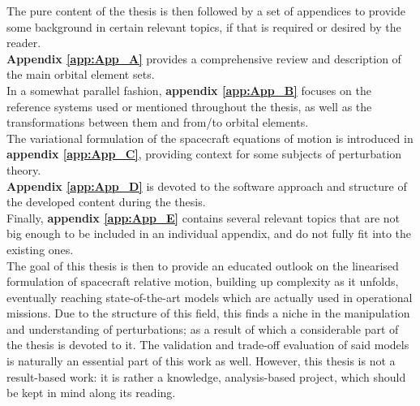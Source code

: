 %
\indent The pure content of the thesis is then followed by a set of appendices to provide some background in certain relevant topics, if that is required or desired by the reader. \\
%
\indent \textbf{Appendix \ref{app:App_A}} provides a comprehensive review and description of the main orbital element sets. \\
%
\indent In a somewhat parallel fashion, \textbf{appendix \ref{app:App_B}} focuses on the reference systems used or mentioned throughout the thesis, as well as the transformations between them and from/to orbital elements.\\
%
\indent The variational formulation of the spacecraft equations of motion is introduced in \textbf{appendix \ref{app:App_C}}, providing context for some subjects of perturbation theory. \\
%
\indent \textbf{Appendix \ref{app:App_D}} is devoted to the software approach and structure of the developed content during the thesis.\\
%
\indent Finally, \textbf{appendix \ref{app:App_E}} contains several relevant topics that are not big enough to be included in an individual appendix, and do not fully fit into the existing ones.\\
%
\indent The goal of this thesis is then to provide an educated outlook on the linearised formulation of spacecraft relative motion, building up complexity as it unfolds, eventually reaching state-of-the-art models which are actually used in operational missions. Due to the structure of this field, this finds a niche in the manipulation and understanding of perturbations; as a result of which a considerable part of the thesis is devoted to it. The validation and trade-off evaluation of said models is naturally an essential part of this work as well. However, this thesis is not a result-based work: it is rather a knowledge, analysis-based project, which should be kept in mind along its reading.
%